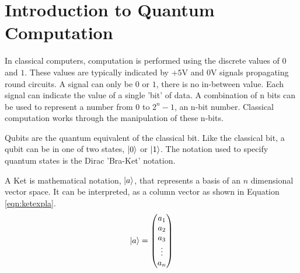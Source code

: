 \section{Introduction to Quantum Computation}
In classical computers, computation is performed using the discrete values of $0$ and $1$.
These values are typically indicated by +$5$V and $0$V signals propagating round circuits.
A signal can only be $0$ or $1$, there is no in-between value.
Each signal can indicate the value of a single 'bit' of data.
A combination of n bits can be used to represent a number from $0$ to $2^n-1$, an n-bit number.
Classical computation works through the manipulation of these n-bits.

Qubits are the quantum equivalent of the classical bit.
Like the classical bit, a qubit can be in one of two states, $\left\vert{0}\right\rangle$ or $\left\vert{1}\right\rangle$.
The notation used to specify quantum states is the Dirac\cite{dirac2004principles} 'Bra-Ket' notation.

A Ket is mathematical notation, $\left\vert{a}\right\rangle$, that represents a basis of an $n$ dimensional vector space.
It can be interpreted, as a column vector as shown in Equation \ref{eqn:ketexpla}.
\begin{equation}
\left\vert{a}\right\rangle = 
\begin{pmatrix}
a_1\\
a_2\\
a_3\\
\vdots \\
a_n
\end{pmatrix}
\label{eqn:ketexpla}
\end{equation}

